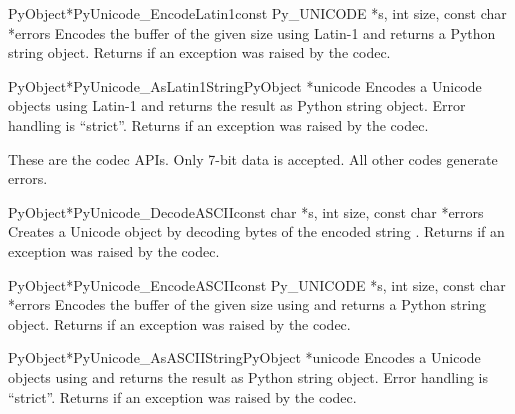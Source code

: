 \begin{cfuncdesc}{PyObject*}{PyUnicode_EncodeLatin1}{const Py_UNICODE *s,
                                                     int size,
                                                     const char *errors}
  Encodes the  buffer of the given size using
  Latin-1 and returns a Python string object.  Returns \NULL{} if an
  exception was raised by the codec.
\end{cfuncdesc}

\begin{cfuncdesc}{PyObject*}{PyUnicode_AsLatin1String}{PyObject *unicode}
  Encodes a Unicode objects using Latin-1 and returns the result as
  Python string object.  Error handling is ``strict''.  Returns
  \NULL{} if an exception was raised by the codec.
\end{cfuncdesc}


These are the \ASCII{} codec APIs.  Only 7-bit \ASCII{} data is
accepted. All other codes generate errors.

\begin{cfuncdesc}{PyObject*}{PyUnicode_DecodeASCII}{const char *s,
                                                    int size,
                                                    const char *errors}
  Creates a Unicode object by decoding  bytes of the
  \ASCII{} encoded string .  Returns \NULL{} if an exception
  was raised by the codec.
\end{cfuncdesc}

\begin{cfuncdesc}{PyObject*}{PyUnicode_EncodeASCII}{const Py_UNICODE *s,
                                                    int size,
                                                    const char *errors}
  Encodes the  buffer of the given size using
  \ASCII{} and returns a Python string object.  Returns \NULL{} if an
  exception was raised by the codec.
\end{cfuncdesc}

\begin{cfuncdesc}{PyObject*}{PyUnicode_AsASCIIString}{PyObject *unicode}
  Encodes a Unicode objects using \ASCII{} and returns the result as
  Python string object.  Error handling is ``strict''.  Returns
  \NULL{} if an exception was raised by the codec.
\end{cfuncdesc}


